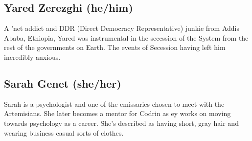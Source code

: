 \begin{comment}
\emph{Appears in:}

\begin{itemize}
\tightlist
\item
  \href{https://toledot.post-self.ink}{\emph{Toledot}}
\item
  \href{https://neviim.post-self.ink}{\emph{Nevi'im}}
\item
  \href{https://mitzvot.post-self.ink}{\emph{Mitzvot} ``Selected Letters''} (mentioned)
\end{itemize}
\end{comment}

\subsection{Yared Zerezghi (he/him)}

A 'net addict and DDR (Direct Democracy Representative) junkie from Addis Ababa, Ethiopia, Yared was instrumental in the secession of the System from the rest of the governments on Earth. The events of Secession having left him incredibly anxious.


\begin{comment}
\emph{Appears in:}

\begin{itemize}
\tightlist
\item
  \href{https://toledot.post-self.ink}{\emph{Toledot}}
\item
  \href{https://mitzvot.post-self.ink}{\emph{Mitzvot}} (mentioned)
\end{itemize}
\end{comment}

\subsection{Sarah Genet (she/her)}

Sarah is a psychologist and one of the emissaries chosen to meet with the Artemisians. She later becomes a mentor for Codrin as ey works on moving towards psychology as a career. She's described as having short, gray hair and wearing business casual sorts of clothes.

\begin{comment}
\emph{Appears in:}

\begin{itemize}
\tightlist
\item
  \href{https://neviim.post-self.ink}{\emph{Nevi'im}}
\item
  \href{https://mitzvot.post-self.ink}{\emph{Mitzvot}} (mentioned)
\end{itemize}
\end{comment}

